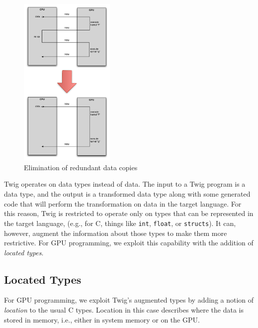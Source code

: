 \begin{figure}[ht]
\label{basic-idea}
\begin{center}
\includegraphics[width=1.8in]{images/basic-idea}
\caption{Elimination of redundant data copies}
\end{center}
\end{figure}

Twig operates on data types instead of data. The input to a Twig program is a
data type, and the output is a transformed data type along with some generated
code that will perform the transformation on data in the target language. For
this reason, Twig is restricted to operate only on types that can be represented
in the target language, (e.g., for C, things like \texttt{int}, \texttt{float},
or \texttt{structs}). It can, however, augment the information about those types
to make them more restrictive. For GPU programming, we exploit this capability
with the addition of \emph{located types}.

\subsection{Located Types}
\label{sec:located-types}


For GPU programming, we exploit Twig's augmented types by adding a notion of
\emph{location} to the usual C types. Location in this case describes where the
data is stored in memory, i.e., either in system memory or on the GPU. 

